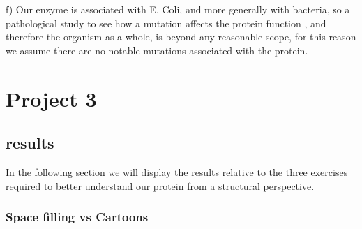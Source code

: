 \documentclass[a4paper,english,12pt,bibliography=totoc]{scrreprt}
\begin{document}
f) Our enzyme is associated with E. Coli, and more generally with bacteria, so a pathological study to see how a mutation affects the protein function , and therefore the organism as a whole, is beyond any reasonable scope, for this reason we assume there are no notable mutations associated with the protein.

\chapter{Project 3}

\section{results}
In the following section we will display the results relative to the three exercises required to better understand our protein from a structural perspective.
\subsection{Space filling vs Cartoons}
\end{document}

